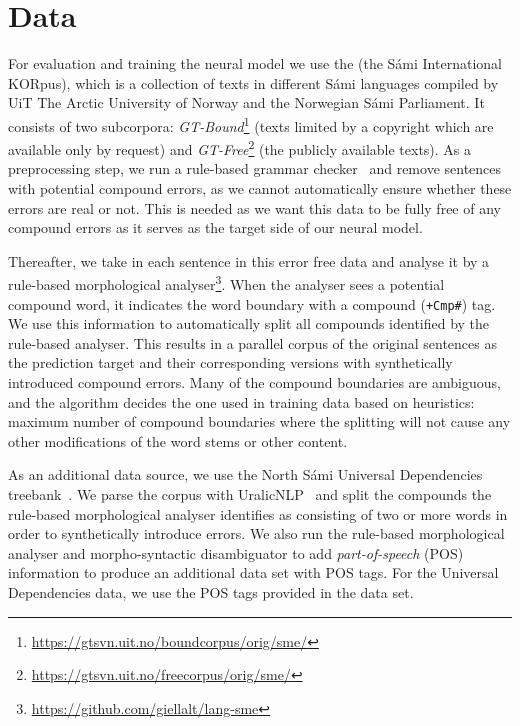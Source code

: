 \documentclass[postprint]{flammie}
\begin{document}
\section{Data}

For evaluation and training the neural model we use the \cite{sikor_06.11.2018}
(the Sámi International KORpus), which is a collection of texts in different
Sámi languages compiled by UiT The Arctic University of Norway and the Norwegian
Sámi Parliament. It consists of two subcorpora:
\textit{GT-Bound}\footnote{\url{https://gtsvn.uit.no/boundcorpus/orig/sme/}}
(texts limited by a copyright which are available only by request) and
\textit{GT-Free}\footnote{\url{https://gtsvn.uit.no/freecorpus/orig/sme/}} (the
publicly available texts). As a preprocessing step, we run a rule-based grammar
checker~\cite{wiechetek2012constraint} and remove sentences with potential compound
errors, as we cannot automatically ensure whether these errors are real or not.
This is needed as we want this data to be fully free of any compound errors as
it serves as the target side of our neural model.

Thereafter, we take in each sentence in this error free data and analyse it by a
rule-based morphological
analyser\footnote{\url{https://github.com/giellalt/lang-sme}}. When the analyser
sees a potential compound word, it indicates the word boundary with a compound
(\texttt{+Cmp\#}) tag. We use this information to automatically split all
compounds identified by the rule-based analyser. This results in a parallel
corpus of the original sentences as the prediction target and their
corresponding versions with synthetically introduced compound errors. Many of
the compound boundaries are ambiguous, and the algorithm decides the one used in
training data based on heuristics: maximum number of compound boundaries where
the splitting will not cause any other modifications of the word stems or other
content.

As an additional data source, we use the North Sámi Universal Dependencies
treebank~\cite{tyers-sheyanova-2017-annotation}. We parse the corpus with
UralicNLP~\cite{uralicnlp} and split the compounds the rule-based
morphological analyser identifies as consisting of two or more words in order to
synthetically introduce errors.  We also run the rule-based morphological
analyser and morpho-syntactic disambiguator to add  \textit{part-of-speech}
(POS) information to produce an additional data set with POS tags. For the
Universal Dependencies data, we use the POS tags provided in the data set.
\end{document}
